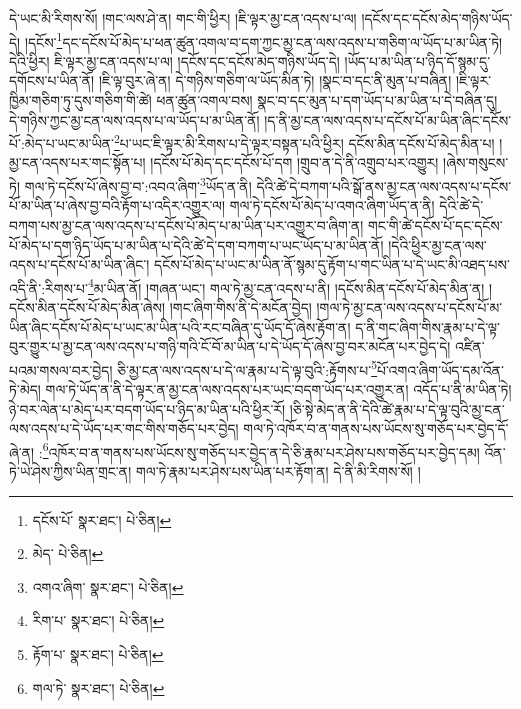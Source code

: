 དེ་ཡང་མི་རིགས་སོ། །གང་ལས་ཤེ་ན། གང་གི་ཕྱིར། །ཇི་ལྟར་མྱ་ངན་འདས་པ་ལ། །དངོས་དང་དངོས་མེད་གཉིས་ཡོད་དེ། །དངོས་\footnote{དངོས་པོ་  སྣར་ཐང་།  པེ་ཅིན། }དང་དངོས་པོ་མེད་པ་ཕན་ཚུན་འགལ་བ་དག་ཀྱང་མྱ་ངན་ལས་འདས་པ་གཅིག་ལ་ཡོད་པ་མ་ཡིན་ཏེ། དེའི་ཕྱིར། ཇི་ལྟར་མྱ་ངན་འདས་པ་ལ། །དངོས་དང་དངོས་མེད་གཉིས་ཡོད་དེ། །ཡོད་པ་མ་ཡིན་པ་ཉིད་དོ་སྙམ་དུ་དགོངས་པ་ཡིན་ནོ། །ཇི་ལྟ་བུར་ཞེ་ན། དེ་གཉིས་གཅིག་ལ་ཡོད་མིན་ཏེ། །སྣང་བ་དང་ནི་མུན་པ་བཞིན། །ཇི་ལྟར་ཁྱིམ་གཅིག་ཏུ་དུས་གཅིག་གི་ཚེ། ཕན་ཚུན་འགལ་བས། སྣང་བ་དང་མུན་པ་དག་ཡོད་པ་མ་ཡིན་པ་དེ་བཞིན་དུ། དེ་གཉིས་ཀྱང་མྱ་ངན་ལས་འདས་པ་ལ་ཡོད་པ་མ་ཡིན་ནོ། །ད་ནི་མྱ་ངན་ལས་འདས་པ་དངོས་པོ་མ་ཡིན་ཞིང་དངོས་པོ་:མེད་པ་ཡང་མ་ཡིན་\footnote{མེད་  པེ་ཅིན། }པ་ཡང་ཇི་ལྟར་མི་རིགས་པ་དེ་ལྟར་བསྟན་པའི་ཕྱིར། དངོས་མིན་དངོས་པོ་མེད་མིན་པ། །མྱ་ངན་འདས་པར་གང་སྟོན་པ། །དངོས་པོ་མེད་དང་དངོས་པོ་དག །གྲུབ་ན་དེ་ནི་འགྲུབ་པར་འགྱུར། །ཞེས་གསུངས་ཏེ། གལ་ཏེ་དངོས་པོ་ཞེས་བྱ་བ་:འབའ་ཞིག་\footnote{འགའ་ཞིག་  སྣར་ཐང་།  པེ་ཅིན། }ཡོད་ན་ནི། དེའི་ཚེ་དེ་བཀག་པའི་སྒོ་ནས་མྱ་ངན་ལས་འདས་པ་དངོས་པོ་མ་ཡིན་པ་ཞེས་བྱ་བའི་རྟོག་པ་འདིར་འགྱུར་ལ། གལ་ཏེ་དངོས་པོ་མེད་པ་འགའ་ཞིག་ཡོད་ན་ནི། དེའི་ཚེ་དེ་བཀག་པས་མྱ་ངན་ལས་འདས་པ་དངོས་པོ་མེད་པ་མ་ཡིན་པར་འགྱུར་བ་ཞིག་ན། གང་གི་ཚེ་དངོས་པོ་དང་དངོས་པོ་མེད་པ་དག་ཉིད་ཡོད་པ་མ་ཡིན་པ་དེའི་ཚེ་དེ་དག་བཀག་པ་ཡང་ཡོད་པ་མ་ཡིན་ནོ། །དེའི་ཕྱིར་མྱ་ངན་ལས་འདས་པ་དངོས་པོ་མ་ཡིན་ཞིང་། དངོས་པོ་མེད་པ་ཡང་མ་ཡིན་ནོ་སྙམ་དུ་རྟོག་པ་གང་ཡིན་པ་དེ་ཡང་མི་འཐད་པས་འདི་ནི་:རིགས་པ་\footnote{རིག་པ་  སྣར་ཐང་།  པེ་ཅིན། }མ་ཡིན་ནོ། །གཞན་ཡང་། གལ་ཏེ་མྱ་ངན་འདས་པ་ནི། །དངོས་མིན་དངོས་པོ་མེད་མིན་ན། །དངོས་མིན་དངོས་པོ་མེད་མིན་ཞེས། །གང་ཞིག་གིས་ནི་དེ་མངོན་བྱེད། །གལ་ཏེ་མྱ་ངན་ལས་འདས་པ་དངོས་པོ་མ་ཡིན་ཞིང་དངོས་པོ་མེད་པ་ཡང་མ་ཡིན་པའི་རང་བཞིན་དུ་ཡོད་དོ་ཞེས་རྟོག་ན། ད་ནི་གང་ཞིག་གིས་རྣམ་པ་དེ་ལྟ་བུར་གྱུར་པ་མྱ་ངན་ལས་འདས་པ་གཉི་གའི་ངོ་བོ་མ་ཡིན་པ་དེ་ཡོད་དོ་ཞེས་བྱ་བར་མངོན་པར་བྱེད་དེ། འཛིན་པའམ་གསལ་བར་བྱེད། ཅི་མྱ་ངན་ལས་འདས་པ་དེ་ལ་རྣམ་པ་དེ་ལྟ་བུའི་:རྟོགས་པ་\footnote{རྟོག་པ་  སྣར་ཐང་།  པེ་ཅིན། }པོ་འགའ་ཞིག་ཡོད་དམ་འོན་ཏེ་མེད། གལ་ཏེ་ཡོད་ན་ནི་དེ་ལྟར་ན་མྱ་ངན་ལས་འདས་པར་ཡང་བདག་ཡོད་པར་འགྱུར་ན། འདོད་པ་ནི་མ་ཡིན་ཏེ། ཉེ་བར་ལེན་པ་མེད་པར་བདག་ཡོད་པ་ཉིད་མ་ཡིན་པའི་ཕྱིར་རོ། །ཅི་སྟེ་མེད་ན་ནི་དེའི་ཚེ་རྣམ་པ་དེ་ལྟ་བུའི་མྱ་ངན་ལས་འདས་པ་དེ་ཡོད་པར་གང་གིས་གཅོད་པར་བྱེད། གལ་ཏེ་འཁོར་བ་ན་གནས་པས་ཡོངས་སུ་གཅོད་པར་བྱེད་དོ་ཞེ་ན། :\footnote{གལ་ཏེ་  སྣར་ཐང་།  པེ་ཅིན། }འཁོར་བ་ན་གནས་པས་ཡོངས་སུ་གཅོད་པར་བྱེད་ན་དེ་ཅི་རྣམ་པར་ཤེས་པས་གཅོད་པར་བྱེད་དམ། འོན་ཏེ་ཡེ་ཤེས་ཀྱིས་ཡིན་གྲང་ན། གལ་ཏེ་རྣམ་པར་ཤེས་པས་ཡིན་པར་རྟོག་ན། དེ་ནི་མི་རིགས་སོ། །
